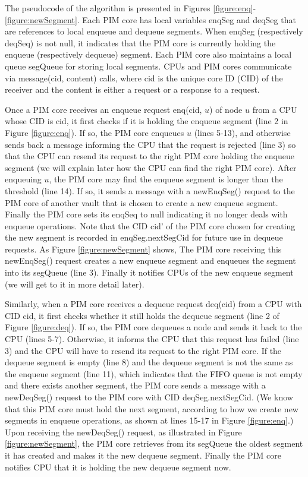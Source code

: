 The pseudocode of the algorithm is presented in 
Figures \ref{figure:enq}-\ref{figure:newSegment}. 
Each PIM core has local variables enqSeg and deqSeg that are references to 
local enqueue and dequeue segments.
When enqSeg (respectively deqSeq) is not null, it indicates that the PIM core is currently 
holding the enqueue (respectively dequeue) segment.
Each PIM core also maintains a local queue segQueue for storing local segments.
CPUs and PIM cores communicate via message(cid, content) calls, where cid is the unique core ID (CID) 
of the receiver and the content is either a request or a response to a request.

Once a PIM core receives an enqueue request enq(cid, $u$) of node $u$ from a CPU whose CID is cid,
it first checks if it is holding the enqueue segment (line 2 in Figure \ref{figure:enq}).
If so, the PIM core enqueues $u$ (lines 5-13), and otherwise sends back a message
informing the CPU that the request is rejected (line 3) so that
the CPU can resend its request to the right PIM core holding the enqueue segment
(we will explain later how the CPU can find the right PIM core).
After enqueuing $u$, the PIM core may find the enqueue segment is longer than the threshold (line 14).
If so, it sends a message with a newEnqSeg() request to the PIM core of another vault that is chosen 
to create a new enqueue segment.
Finally the PIM core sets its enqSeq to null indicating it no longer deals with enqueue operations.
Note that the CID cid' of the PIM core chosen for creating the new segment is recorded in 
enqSeg.nextSegCid for future use in dequeue requests.
As Figure \ref{figure:newSegment} shows,
The PIM core receiving this newEnqSeg() request creates a new enqueue segment and enqueues 
the segment into its segQueue (line 3). 
Finally it notifies CPUs of the new enqueue segment (we will get to it in more detail later).

Similarly, when a PIM core receives a dequeue request deq(cid) from a CPU with CID cid,
it first checks whether it still holds the dequeue segment (line 2 of Figure \ref{figure:deq}).
If so, the PIM core dequeues a node and sends it back to the CPU (lines 5-7).
Otherwise, it informs the CPU that this request has failed (line 3) and
the CPU will have to resend its request to the right PIM core.
If the dequeue segment is empty (line 8) and the dequeue segment is not the same as 
the enqueue segment (line 11), which indicates that the FIFO queue is not empty 
and there exists another segment, the PIM core sends a message with a newDeqSeg() request 
to the PIM core with CID deqSeg.nextSegCid. 
(We know that this PIM core must hold the next segment, 
according to how we create new segments in enqueue operations, 
as shown at lines 15-17 in Figure \ref{figure:enq}.) 
Upon receiving the newDeqSeg() request, as illustrated in Figure \ref{figure:newSegment}, 
the PIM core retrieves from its segQueue the oldest segment it has created and 
makes it the new dequeue segment. 
Finally the PIM core notifies CPU that it is holding the new dequeue segment now.

